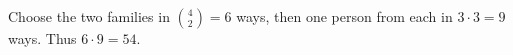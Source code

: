 Choose the two families in $\binom42=6$ ways, then one person from each in $3\cdot3=9$ ways. Thus $6\cdot9=\boxed{54}$.
